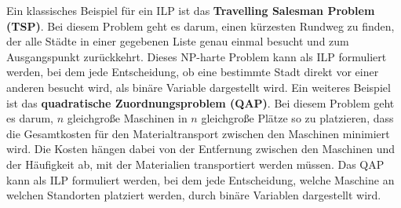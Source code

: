 \documentclass[bachelor, german]{algothesis}
\begin{document}
Ein klassisches Beispiel für ein ILP ist das \textbf{Travelling Salesman Problem (TSP)}. Bei diesem Problem geht es darum, einen kürzesten Rundweg zu finden, der alle Städte in einer gegebenen Liste genau einmal besucht und zum Ausgangspunkt zurückkehrt. Dieses NP-harte Problem kann als ILP formuliert werden, bei dem jede Entscheidung, ob eine bestimmte Stadt direkt vor einer anderen besucht wird, als binäre Variable dargestellt wird.\newline
Ein weiteres Beispiel ist das \textbf{quadratische Zuordnungsproblem (QAP)}. Bei diesem Problem geht es darum, $n$ gleichgroße Maschinen in $n$ gleichgroße Plätze so zu platzieren, dass die Gesamtkosten für den Materialtransport zwischen den Maschinen minimiert wird. Die Kosten hängen dabei von der Entfernung zwischen den Maschinen und der Häufigkeit ab, mit der Materialien transportiert werden müssen. Das QAP kann als ILP formuliert werden, bei dem jede Entscheidung, welche Maschine an welchen Standorten platziert werden, durch binäre Variablen dargestellt wird.
\end{document}
